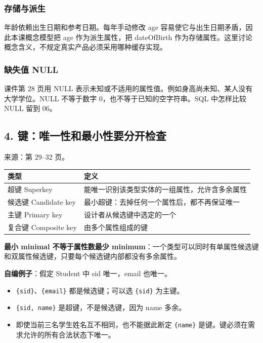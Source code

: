 \subsubsection{存储与派生}\label{02_er_modelling_zh-ux5b58ux50a8ux4e0eux6d3eux751f}

年龄依赖出生日期和参考日期。每年手动修改 age 容易使它与出生日期矛盾，因此本课概念模型把 age 作为派生属性，把 dateOfBirth 作为存储属性。这里讨论概念含义，不规定真实产品必须采用哪种缓存实现。

\subsubsection{缺失值 NULL}\label{02_er_modelling_zh-ux7f3aux5931ux503c-null}

课件第 28 页用 NULL 表示未知或不适用的属性值。例如身高尚未知、某人没有大学学位。NULL 不等于数字 0，也不等于已知的空字符串。SQL 中怎样比较 NULL 留到 06。

\subsection{4. 键：唯一性和最小性要分开检查}\label{02_er_modelling_zh-ux952eux552fux4e00ux6027ux548cux6700ux5c0fux6027ux8981ux5206ux5f00ux68c0ux67e5}

来源：第 29--32 页。

\begin{longtable}[]{@{}ll@{}}
\toprule\noalign{}
类型 & 定义 \\
\midrule\noalign{}
\endhead
\bottomrule\noalign{}
\endlastfoot
超键 Superkey & 能唯一识别该类型实体的一组属性，允许含多余属性 \\
候选键 Candidate key & 最小超键：去掉任何一个属性后，都不再保证唯一 \\
主键 Primary key & 设计者从候选键中选定的一个 \\
复合键 Composite key & 由多个属性组成的键 \\
\end{longtable}

\textbf{最小 minimal 不等于属性数最少 minimum}：一个类型可以同时有单属性候选键和双属性候选键，只要每个候选键内部都没有多余属性。

\textbf{自编例子}：假定 Student 中 sid 唯一，email 也唯一。

\begin{itemize}
\tightlist
\item
  \texttt{\{sid\}}、\texttt{\{email\}} 都是候选键；可以选 \texttt{\{sid\}} 为主键。
\item
  \texttt{\{sid,\ name\}} 是超键，不是候选键，因为 name 多余。
\item
  即使当前三名学生姓名互不相同，也不能据此断定 \texttt{\{name\}} 是键。键必须在需求允许的所有合法状态下唯一。
\end{itemize}

